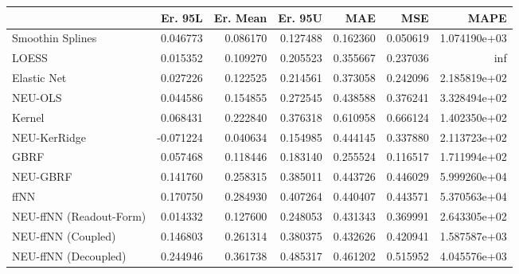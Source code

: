 \begin{tabular}{lrrrrrr}
\toprule
{} &   Er. 95L &  Er. Mean &   Er. 95U &       MAE &       MSE &          MAPE \\
\midrule
Smoothin Splines        &  0.046773 &  0.086170 &  0.127488 &  0.162360 &  0.050619 &  1.074190e+03 \\
LOESS                   &  0.015352 &  0.109270 &  0.205523 &  0.355667 &  0.237036 &           inf \\
Elastic Net             &  0.027226 &  0.122525 &  0.214561 &  0.373058 &  0.242096 &  2.185819e+02 \\
NEU-OLS                 &  0.044586 &  0.154855 &  0.272545 &  0.438588 &  0.376241 &  3.328494e+02 \\
Kernel                  &  0.068431 &  0.222840 &  0.376318 &  0.610958 &  0.666124 &  1.402350e+02 \\
NEU-KerRidge            & -0.071224 &  0.040634 &  0.154985 &  0.444145 &  0.337880 &  2.113723e+02 \\
GBRF                    &  0.057468 &  0.118446 &  0.183140 &  0.255524 &  0.116517 &  1.711994e+02 \\
NEU-GBRF                &  0.141760 &  0.258315 &  0.385011 &  0.443726 &  0.446029 &  5.999260e+04 \\
ffNN                    &  0.170750 &  0.284930 &  0.407264 &  0.440407 &  0.443571 &  5.370563e+04 \\
NEU-ffNN (Readout-Form) &  0.014332 &  0.127600 &  0.248053 &  0.431343 &  0.369991 &  2.643305e+02 \\
NEU-ffNN (Coupled)      &  0.146803 &  0.261314 &  0.380375 &  0.432626 &  0.420941 &  1.587587e+03 \\
NEU-ffNN (Decoupled)    &  0.244946 &  0.361738 &  0.485317 &  0.461202 &  0.515952 &  4.045576e+03 \\
\bottomrule
\end{tabular}
